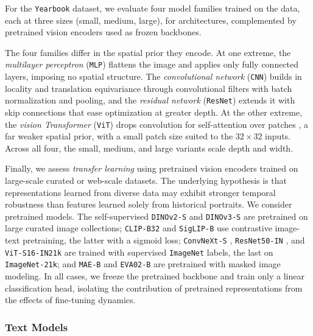 For the \texttt{Yearbook} dataset, we evaluate four model families trained on the data, each at three sizes (small, medium, large), for  architectures, complemented by  pretrained vision encoders used as frozen backbones.

The four families differ in the spatial prior they encode. At one extreme, the \emph{multilayer perceptron} (\texttt{MLP}) flattens the image and applies only fully connected layers, imposing no spatial structure. The \emph{convolutional network} (\texttt{CNN}) builds in locality and translation equivariance through convolutional filters with batch normalization and pooling, and the \emph{residual network} (\texttt{ResNet}) extends it with skip connections \cite{he2016resnet} that ease optimization at greater depth. At the other extreme, the \emph{vision Transformer} (\texttt{ViT}) drops convolution for self-attention over patches \cite{dosovitskiy2021vit}, a far weaker spatial prior, with a small patch size suited to the $32\times32$ inputs. Across all four, the small, medium, and large variants scale depth and width.

Finally, we assess \emph{transfer learning} using pretrained vision encoders trained on large-scale curated or web-scale datasets. The underlying hypothesis is that representations learned from diverse data may exhibit stronger temporal robustness than features learned solely from historical portraits. We consider  pretrained models. The self-supervised \texttt{DINOv2-S} \cite{oquab2024dinov2} and \texttt{DINOv3-S} \cite{simeoni2025dinov3} are pretrained on large curated image collections; \texttt{CLIP-B32} \cite{radford2021clip} and \texttt{SigLIP-B} \cite{zhai2023siglip} use contrastive image-text pretraining, the latter with a sigmoid loss; \texttt{ConvNeXt-S} \cite{liu2022convnext}, \texttt{ResNet50-IN} \cite{he2016resnet}, and \texttt{ViT-S16-IN21k} \cite{dosovitskiy2021vit} are trained with supervised \texttt{ImageNet} labels, the last on \texttt{ImageNet-21k}; and \texttt{MAE-B} \cite{he2022mae} and \texttt{EVA02-B} \cite{fang2024eva02} are pretrained with masked image modeling. In all cases, we freeze the pretrained backbone and train only a linear classification head, isolating the contribution of pretrained representations from the effects of fine-tuning dynamics.




\subsubsection{Text Models}

